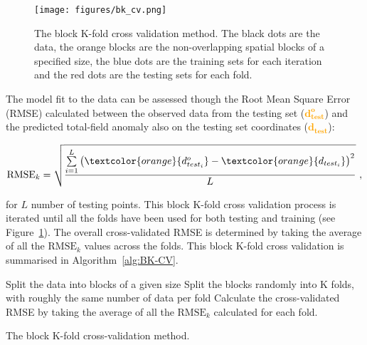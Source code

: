 \begin{figure}[tb]
  \centering
  \texttt{[image: figures/bk\_cv.png]}
  \caption{
    The block K-fold cross validation method. The black dots are the data, the orange blocks are the non-overlapping spatial blocks of a specified size, the blue dots are the training sets for each iteration and the red dots are the testing sets for each fold.
    }
  \label{fig:BK-CV}
\end{figure}

The model fit to the data can be assessed though the Root Mean Square Error (RMSE) calculated between the observed data from the testing set (\textcolor{orange}{$\mathbf{d^o_{test}}$}) and the predicted total-field anomaly also on the testing set coordinates (\textcolor{orange}{$\mathbf{d_{test}}$}):

\begin{equation}
    \label{eq:rmse}
    \text{RMSE}_k = \sqrt{\dfrac{\sum\limits_{i=1}^L \left(\textcolor{orange}{{d^o_{test_i}}} - \textcolor{orange}{{d_{test_i}}}\right)^2}{L}}
    \ ,
\end{equation}

\noindent
for $L$ number of testing points. This block K-fold cross validation process is iterated until all the folds have been used for both testing and training (see Figure~\ref{fig:BK-CV}). The overall cross-validated RMSE is determined by taking the average of all the $\text{RMSE}_k$ values across the folds. This block K-fold cross validation is summarised in Algorithm~\ref{alg:BK-CV}.

\begin{algorithm}[!h]
    Split the data into blocks of a given size
    \;
    Split the blocks randomly into K folds, with roughly the same number of data per fold
    \;
    Calculate the cross-validated RMSE by taking the average of all the $\text{RMSE}_k$ calculated for each fold.
    \BlankLine
    \caption{The block K-fold cross-validation method.}
    \label{alg:BK-CV}
\end{algorithm}

